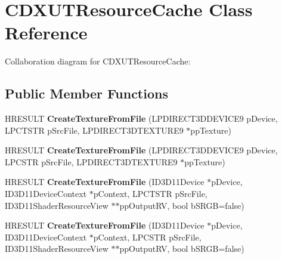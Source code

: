 \hypertarget{class_c_d_x_u_t_resource_cache}{\section{C\+D\+X\+U\+T\+Resource\+Cache Class Reference}
\label{class_c_d_x_u_t_resource_cache}
}


Collaboration diagram for C\+D\+X\+U\+T\+Resource\+Cache\+:
\subsection*{Public Member Functions}
\begin{DoxyCompactItemize}
\item 
\hypertarget{class_c_d_x_u_t_resource_cache_a682c9c2045cc661670d98412deb5f4ef}{H\+R\+E\+S\+U\+L\+T {\bfseries Create\+Texture\+From\+File} (L\+P\+D\+I\+R\+E\+C\+T3\+D\+D\+E\+V\+I\+C\+E9 p\+Device, L\+P\+C\+T\+S\+T\+R p\+Src\+File, L\+P\+D\+I\+R\+E\+C\+T3\+D\+T\+E\+X\+T\+U\+R\+E9 $\ast$pp\+Texture)}\label{class_c_d_x_u_t_resource_cache_a682c9c2045cc661670d98412deb5f4ef}

\item 
\hypertarget{class_c_d_x_u_t_resource_cache_a0feb4830cc2b6d963d14849ae15816ee}{H\+R\+E\+S\+U\+L\+T {\bfseries Create\+Texture\+From\+File} (L\+P\+D\+I\+R\+E\+C\+T3\+D\+D\+E\+V\+I\+C\+E9 p\+Device, L\+P\+C\+S\+T\+R p\+Src\+File, L\+P\+D\+I\+R\+E\+C\+T3\+D\+T\+E\+X\+T\+U\+R\+E9 $\ast$pp\+Texture)}\label{class_c_d_x_u_t_resource_cache_a0feb4830cc2b6d963d14849ae15816ee}

\item 
\hypertarget{class_c_d_x_u_t_resource_cache_a73937868cad643f42606bc33fe65ac0c}{H\+R\+E\+S\+U\+L\+T {\bfseries Create\+Texture\+From\+File} (I\+D3\+D11\+Device $\ast$p\+Device, I\+D3\+D11\+Device\+Context $\ast$p\+Context, L\+P\+C\+T\+S\+T\+R p\+Src\+File, I\+D3\+D11\+Shader\+Resource\+View $\ast$$\ast$pp\+Output\+R\+V, bool b\+S\+R\+G\+B=false)}\label{class_c_d_x_u_t_resource_cache_a73937868cad643f42606bc33fe65ac0c}

\item 
\hypertarget{class_c_d_x_u_t_resource_cache_a827fb8c4c3b9cb638efa6433ca056e01}{H\+R\+E\+S\+U\+L\+T {\bfseries Create\+Texture\+From\+File} (I\+D3\+D11\+Device $\ast$p\+Device, I\+D3\+D11\+Device\+Context $\ast$p\+Context, L\+P\+C\+S\+T\+R p\+Src\+File, I\+D3\+D11\+Shader\+Resource\+View $\ast$$\ast$pp\+Output\+R\+V, bool b\+S\+R\+G\+B=false)}\label{class_c_d_x_u_t_resource_cache_a827fb8c4c3b9cb638efa6433ca056e01}


\end{DoxyCompactItemize}
